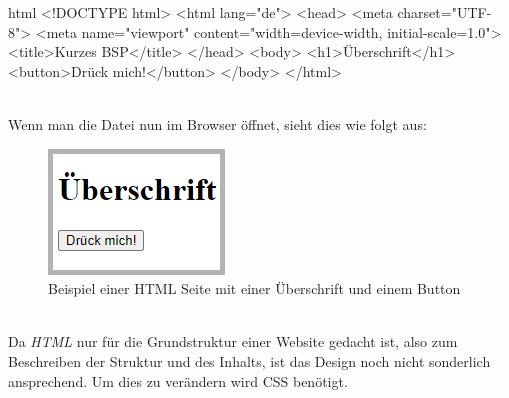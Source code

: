 		\begin{code}{html}
			<!DOCTYPE html>
			<html lang="de">
				<head>
					<meta charset="UTF-8">
					<meta name="viewport" content="width=device-width, initial-scale=1.0">
					<title>Kurzes BSP</title>
				</head>
				<body>
					<h1>Überschrift</h1>
					<button>Drück mich!</button>
				</body>
			</html>
		\end{code}
	\label{list:htmlbsp} ~\\
		Wenn man die Datei nun im Browser öffnet, sieht dies wie folgt aus:
		\begin{figure}[H]
			\centering
			\includegraphics[width=0.3\linewidth]{images/ldehner_study/html1}
			\caption[HTML Beispielseite]{Beispiel einer HTML Seite mit einer Überschrift und einem Button}
			\label{fig:htmlbsp}
		\end{figure}
		~\\
		Da \textit{HTML} nur für die Grundstruktur einer Website gedacht ist, also zum Beschreiben der Struktur und des Inhalts, ist das Design noch nicht sonderlich ansprechend. Um dies zu verändern wird CSS benötigt.
		
